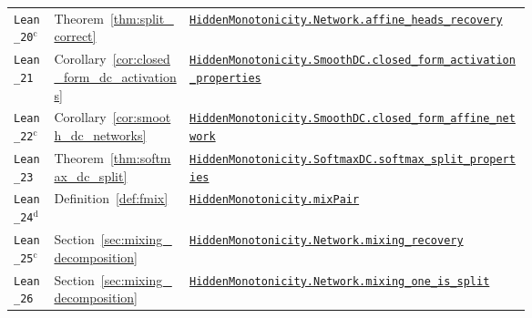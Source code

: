 {\begin{longtable}{@{}l l >{\raggedright\arraybackslash}p{0.66\linewidth}@{}}
\texttt{Lean\_20}$^{\mathrm c}$ & Theorem~\ref{thm:split_correct} & \href{https://github.com/JayPiZimmermann/A-Structural-Approach-to-Explainable-Deep-Learning/blob/b1c18a7ed02eadd720b0b693794ba7e7dd2628f6/formalization/HiddenMonotonicity/AffineHeads.lean\#L16}{\texttt{HiddenMonotonicity.\allowbreak Network.\allowbreak affine\_heads\_recovery}} \\
\texttt{Lean\_21} & Corollary~\ref{cor:closed_form_dc_activations} & \href{https://github.com/JayPiZimmermann/A-Structural-Approach-to-Explainable-Deep-Learning/blob/b1c18a7ed02eadd720b0b693794ba7e7dd2628f6/formalization/HiddenMonotonicity/ClosedFormMonotoneDC.lean\#L44}{\texttt{HiddenMonotonicity.\allowbreak SmoothDC.\allowbreak closed\_form\_activation\_properties}} \\
\texttt{Lean\_22}$^{\mathrm c}$ & Corollary~\ref{cor:smooth_dc_networks} & \href{https://github.com/JayPiZimmermann/A-Structural-Approach-to-Explainable-Deep-Learning/blob/b1c18a7ed02eadd720b0b693794ba7e7dd2628f6/formalization/HiddenMonotonicity/ClosedFormMonotoneDC.lean\#L82}{\texttt{HiddenMonotonicity.\allowbreak SmoothDC.\allowbreak closed\_form\_affine\_network}} \\
\texttt{Lean\_23} & Theorem~\ref{thm:softmax_dc_split} & \href{https://github.com/JayPiZimmermann/A-Structural-Approach-to-Explainable-Deep-Learning/blob/b1c18a7ed02eadd720b0b693794ba7e7dd2628f6/formalization/HiddenMonotonicity/ExplicitSoftmax.lean\#L208}{\texttt{HiddenMonotonicity.\allowbreak SoftmaxDC.\allowbreak softmax\_split\_properties}} \\
\texttt{Lean\_24}$^{\mathrm d}$ & Definition~\ref{def:fmix} & \href{https://github.com/JayPiZimmermann/A-Structural-Approach-to-Explainable-Deep-Learning/blob/b1c18a7ed02eadd720b0b693794ba7e7dd2628f6/formalization/HiddenMonotonicity/Decomposition.lean\#L50}{\texttt{HiddenMonotonicity.\allowbreak mixPair}} \\
\texttt{Lean\_25}$^{\mathrm c}$ & Section~\ref{sec:mixing_decomposition} & \href{https://github.com/JayPiZimmermann/A-Structural-Approach-to-Explainable-Deep-Learning/blob/b1c18a7ed02eadd720b0b693794ba7e7dd2628f6/formalization/HiddenMonotonicity/Decomposition.lean\#L59}{\texttt{HiddenMonotonicity.\allowbreak Network.\allowbreak mixing\_recovery}} \\
\texttt{Lean\_26} & Section~\ref{sec:mixing_decomposition} & \href{https://github.com/JayPiZimmermann/A-Structural-Approach-to-Explainable-Deep-Learning/blob/b1c18a7ed02eadd720b0b693794ba7e7dd2628f6/formalization/HiddenMonotonicity/Decomposition.lean\#L66}{\texttt{HiddenMonotonicity.\allowbreak Network.\allowbreak mixing\_one\_is\_split}} \\

\end{longtable}}
